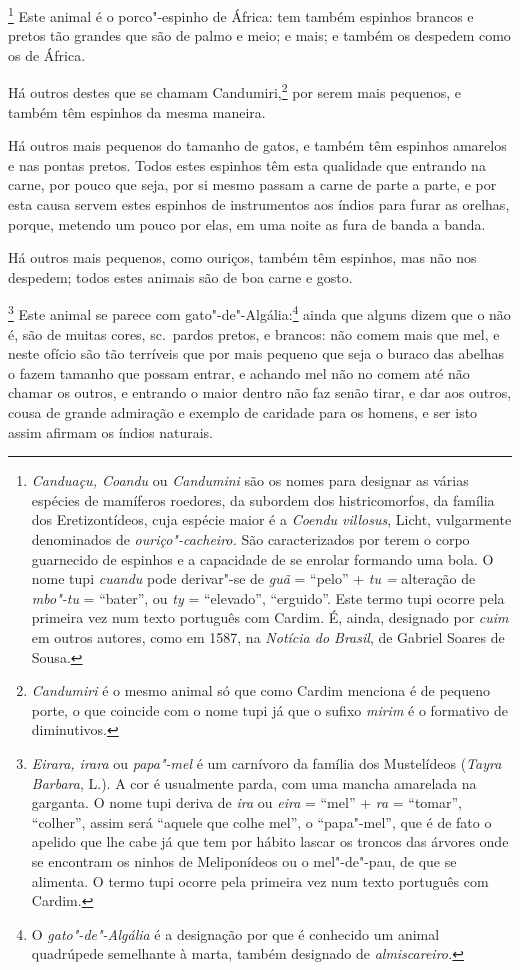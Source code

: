 \footnote{ \textit{Canduaçu, Coandu} ou
\textit{Candumini} são os nomes para designar as várias espécies de
mamíferos roedores, da subordem dos histricomorfos, da família dos
Eretizontídeos, cuja espécie maior é a \textit{Coendu villosus}, 
Licht, vulgarmente denominados de \textit{ouriço"-cacheiro.} São
caracterizados por terem o corpo guarnecido de espinhos e a capacidade
de se enrolar formando uma bola. O nome tupi \textit{cuandu} pode
derivar"-se de \textit{guã} = ``pelo'' + \textit{tu =} alteração de
\textit{mbo"-tu} = ``bater'', ou \textit{ty} = ``elevado'', ``erguido''. Este
termo tupi ocorre pela primeira vez num texto português com Cardim. É,
ainda, designado por \textit{cuim} em outros autores, como em 1587, na
\textit{Notícia do Brasil}, de Gabriel Soares de Sousa.} Este
animal é o porco"-espinho de África: tem também espinhos brancos e
pretos tão grandes que são de palmo e meio; e mais; e também os
despedem como os de África.

 Há outros destes que se chamam Candumiri,\footnote{ \textit{Candumiri} 
é o mesmo animal só que como Cardim menciona é de pequeno porte, o
que coincide com o nome tupi já que o sufixo \textit{mirim} é o
formativo de diminutivos.} por serem mais pequenos, e também
têm espinhos da mesma maneira.

 Há outros mais pequenos do tamanho de gatos, e também têm espinhos
amarelos e nas pontas pretos. Todos estes espinhos têm esta qualidade
que entrando na carne, por pouco que seja, por si mesmo passam a carne
de parte a parte, e por esta causa servem estes espinhos de
instrumentos aos índios para furar as orelhas, porque, metendo um pouco
por elas, em uma noite as fura de banda a banda.

 Há outros mais pequenos, como ouriços, também têm espinhos, mas não nos
despedem; todos estes animais são de boa carne e gosto. 

\footnote{ \textit{Eirara, irara} ou
\textit{papa"-mel} é um carnívoro da família dos Mustelídeos
(\textit{Tayra Barbara}, L.). A cor é usualmente parda, com uma mancha
amarelada na garganta. O nome tupi deriva de \textit{ira} ou
\textit{eira} = ``mel'' + \textit{ra} = ``tomar'', ``colher'', assim será ``aquele 
que colhe mel'', o ``papa"-mel'', que é de fato o apelido que 
lhe cabe já que tem por hábito lascar os troncos das árvores onde se
encontram os ninhos de Meliponídeos ou o mel"-de"-pau, de que se
alimenta. O termo tupi ocorre pela primeira vez num texto português com
Cardim.} Este animal se parece com gato"-de"-Algália:\footnote{ O 
\textit{gato"-de"-Algália} é a designação por que é conhecido um animal
quadrúpede semelhante à marta, também designado de
\textit{almiscareiro.}} ainda que alguns dizem que o não é, são de
muitas cores, sc.~pardos pretos, e brancos: não comem mais que mel, e
neste ofício são tão terríveis que por mais pequeno que seja o buraco
das abelhas o fazem tamanho que possam entrar, e achando mel não no
comem até não chamar os outros, e entrando o maior dentro não faz senão
tirar, e dar aos outros, cousa de grande admiração e exemplo de
caridade para os homens, e ser isto assim afirmam os índios naturais.

